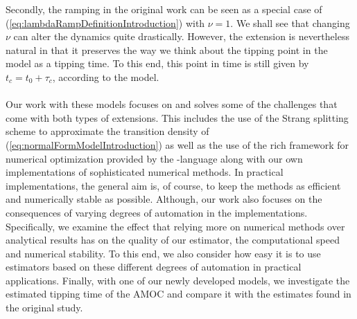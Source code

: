 Secondly, the ramping in the original work \cite[equation (2)]{Ditlevsen2023} can be seen as a special case of (\ref{eq:lambdaRampDefinitionIntroduction}) with $\nu = 1$. We shall see that changing $\nu$ can alter the dynamics quite drastically. However, the extension is nevertheless natural in that it preserves the way we think about the tipping point in the model as a tipping time. To this end, this point in time is still given by $t_c = t_0 + \tau_c$, according to the model.\\\\
Our work with these models focuses on and solves some of the challenges that come with both types of extensions. This includes the use of the Strang splitting scheme\cite{SplittingSchemes} to approximate the transition density of (\ref{eq:normalFormModelIntroduction}) as well as the use of the rich framework for numerical optimization provided by the -language along with our own implementations of sophisticated numerical methods. \cite{Rlang} In practical implementations, the general aim is, of course, to keep the methods as efficient and numerically stable as possible. Although, our work also focuses on the consequences of varying degrees of automation in the implementations. Specifically, we examine the effect that relying more on numerical methods over analytical results has on the quality of our estimator, the computational speed and numerical stability. To this end, we also consider how easy it is to use estimators based on these different degrees of automation in practical applications. Finally, with one of our newly developed models, we investigate the estimated tipping time of the AMOC and compare it with the estimates found in the original study.
